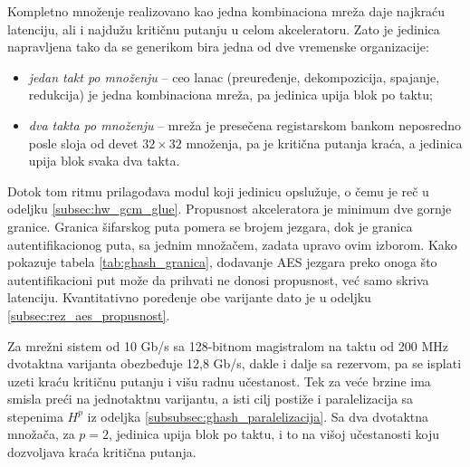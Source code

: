 Kompletno množenje realizovano kao jedna kombinaciona mreža daje najkraću latenciju, ali i najdužu kritičnu putanju u celom akceleratoru. Zato je jedinica napravljena tako da se generikom bira jedna od dve vremenske organizacije:
\begin{itemize}[itemsep=2pt]
    \item \textit{jedan takt po množenju} -- ceo lanac (preuređenje, dekompozicija, spajanje, redukcija) je jedna kombinaciona mreža, pa jedinica upija blok po taktu;
    \item \textit{dva takta po množenju} -- mreža je presečena registarskom bankom neposredno posle sloja od devet $32 \times 32$ množenja, pa je kritična putanja kraća, a jedinica upija blok svaka dva takta.
\end{itemize}
Dotok tom ritmu prilagođava modul koji jedinicu opslužuje, o čemu je reč u odeljku \ref{subsec:hw_gcm_glue}.
\smallbreak
Propusnost akceleratora je minimum dve gornje granice. Granica šifarskog puta pomera se brojem jezgara, dok je granica autentifikacionog puta, sa jednim množačem, zadata upravo ovim izborom. Kako pokazuje tabela \ref{tab:ghash_granica}, dodavanje AES jezgara preko onoga što autentifikacioni put može da prihvati ne donosi propusnost, već samo skriva latenciju. Kvantitativno poređenje obe varijante dato je u odeljku \ref{subsec:rez_aes_propusnost}.

\begin{table}[H]
\caption{Uticaj vremenske organizacije GHASH jedinice na granicu propusnosti akceleratora}
\centering
{}
\label{tab:ghash_granica}
\end{table}

Za mrežni sistem od 10 Gb/s sa 128-bitnom magistralom na taktu od 200 MHz dvotaktna varijanta obezbeđuje 12,8 Gb/s, dakle i dalje sa rezervom, pa se isplati uzeti kraću kritičnu putanju i višu radnu učestanost. Tek za veće brzine ima smisla preći na jednotaktnu varijantu, a isti cilj postiže i paralelizacija sa stepenima $H^p$ iz odeljka \ref{subsubsec:ghash_paralelizacija}. Sa dva dvotaktna množača, za $p = 2$, jedinica upija blok po taktu, i to na višoj učestanosti koju dozvoljava kraća kritična putanja.

